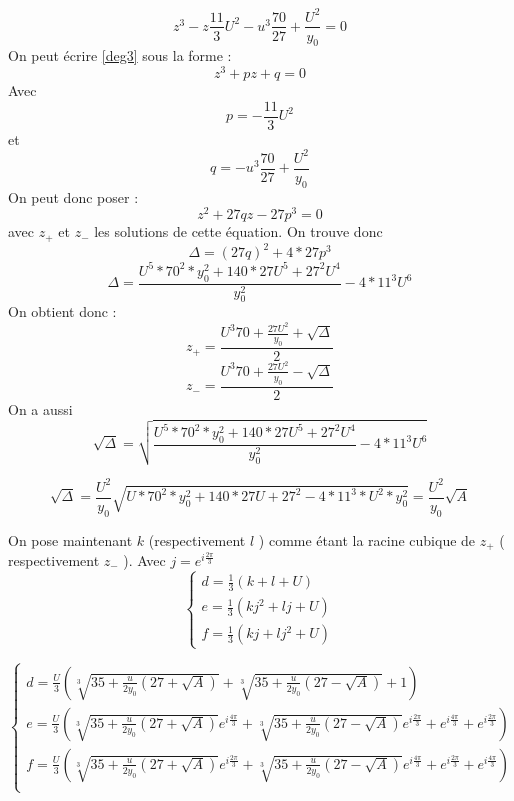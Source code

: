 \documentclass[12pt]{article}
\begin{document}
\begin{equation}
\label{deg3}
z^3 - z\frac{11}{3}U^2 - u^3\frac{70}{27}+\frac{U^2}{y_0} = 0 
\end{equation}
On peut \'ecrire \ref{deg3} sous la forme :
\begin{equation}
z^3+pz+q = 0
\end{equation}
Avec $$p = -\frac{11}{3}U^2$$ et $$q = - u^3\frac{70}{27}+\frac{U^2}{y_0} $$
On peut donc poser :
\begin{equation}
z^2+27qz - 27p^3 = 0 
\end{equation}
avec $z_{+}$ et $z_{-}$ les solutions de cette \'equation.
On trouve donc $$\Delta = (27q)^2 + 4*27p^3$$
\begin{equation}
\Delta = \frac{U^5*70^2*y_0^2+ 140*27U^5+27^2U^4}{y_0^2} - 4*11^3U^6 
\end{equation}
On obtient donc :
\begin{equation}
z_+ = \frac{U^3 70 + \frac{27U^2}{y_0} +\sqrt{\Delta}}{2} 
\end{equation}
\begin{equation}
z_- = \frac{U^3 70 + \frac{27U^2}{y_0} -\sqrt{\Delta}}{2}  
\end{equation}
On a aussi
\begin{equation}
 \sqrt{\Delta} = \sqrt{\frac{U^5*70^2*y_0^2+ 140*27U^5+27^2U^4}{y_0^2} - 4*11^3U^6 }
\end{equation}

\begin{equation}
 \sqrt{\Delta} = \frac{U^2}{y_0} \sqrt{U*70^2*y_0^2+ 140*27U+27^2 -4*11^3*U^2*y_0^2} = \frac{U^2}{y_0} \sqrt{A}
\end{equation}

On pose maintenant $k$ (respectivement $l$ ) comme \'etant la racine cubique de $z_+$ ( respectivement $z_-$ ).
 Avec $j = e^{i\frac{2\pi}{3}}$
\begin{equation}
\left\{ \begin{array}{rl}
d = \frac{1}{3} ( k + l + U)\\
e = \frac{1}{3} (kj^2 + lj + U)\\
f = \frac{1}{3} (kj + lj^2 + U)
\end{array} \right.
\end{equation} 


\begin{equation}
\left\{ \begin{array}{rl}
d = \frac{U}{3} ( \sqrt[3]{35+\frac{u}{2y_0}(27 + \sqrt{A})}+\sqrt[3]{35+\frac{u}{2y_0}(27 - \sqrt{A})} + 1)\\
e = \frac{U}{3} (\sqrt[3]{35+\frac{u}{2y_0}(27 + \sqrt{A})} e^{i\frac{4\pi}{3}}  +   \sqrt[3]{35+\frac{u}{2y_0}(27 - \sqrt{A})}e^{i \frac{2\pi}{3}} 
+ e^{i\frac{4\pi}{3}} + e^{i\frac{2\pi}{3}} )\\
f = \frac{U}{3} (\sqrt[3]{35+\frac{u}{2y_0}(27 + \sqrt{A})} e^{i\frac{2\pi}{3}}  +   \sqrt[3]{35+\frac{u}{2y_0}(27 - \sqrt{A})}e^{i \frac{4\pi}{3}} 
+ e^{i\frac{2\pi}{3}} + e^{i\frac{4\pi}{3}} )\\
\end{array} \right.
\end{equation}
\end{document}
